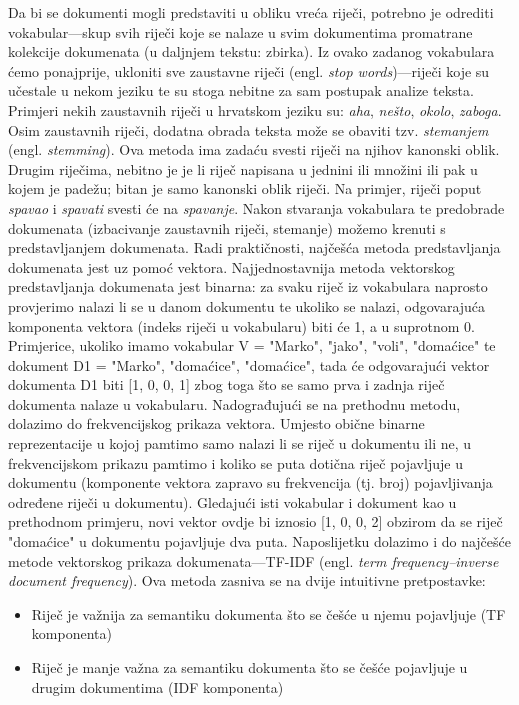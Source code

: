 \documentclass[times, utf8, zavrsni]{fer}
\begin{document}
Da bi se dokumenti mogli predstaviti u obliku vreća riječi, potrebno je odrediti vokabular—skup svih riječi koje se nalaze u svim dokumentima promatrane kolekcije dokumenata (u daljnjem tekstu: zbirka). Iz ovako zadanog vokabulara ćemo ponajprije, ukloniti sve zaustavne riječi (engl. \textit{stop words})—riječi koje su učestale u nekom jeziku te su stoga nebitne za sam postupak analize teksta. Primjeri nekih zaustavnih riječi u hrvatskom jeziku su: \textit{aha}, \textit{nešto}, \textit{okolo}, \textit{zaboga}. Osim zaustavnih riječi, dodatna obrada teksta može se obaviti tzv. \textit{stemanjem} (engl. \textit{stemming}). Ova metoda ima zadaću svesti riječi na njihov kanonski oblik. Drugim riječima, nebitno je je li riječ napisana u jednini ili množini ili pak u kojem je padežu; bitan je samo kanonski oblik riječi. Na primjer, riječi poput \textit{spavao} i \textit{spavati} svesti će na \textit{spavanje}.
Nakon stvaranja vokabulara te predobrade dokumenata (izbacivanje zaustavnih riječi, stemanje) možemo krenuti s predstavljanjem dokumenata. Radi praktičnosti, najčešća metoda predstavljanja dokumenata jest uz pomoć vektora.
Najjednostavnija metoda vektorskog predstavljanja dokumenata jest binarna: za svaku riječ iz vokabulara naprosto provjerimo nalazi li se u danom dokumentu te ukoliko se nalazi, odgovarajuća komponenta vektora (indeks riječi u vokabularu) biti će 1, a u suprotnom 0. Primjerice, ukoliko imamo vokabular V = {"Marko", "jako", "voli", "domaćice"} te dokument D1 = {"Marko", "domaćice", "domaćice"}, tada će odgovarajući vektor dokumenta D1 biti [1, 0, 0, 1] zbog toga što se samo prva i zadnja riječ dokumenta nalaze u vokabularu.
Nadograđujući se na prethodnu metodu, dolazimo do frekvencijskog prikaza vektora. Umjesto obične binarne reprezentacije u kojoj pamtimo samo nalazi li se riječ u dokumentu ili ne, u frekvencijskom prikazu pamtimo i koliko se puta dotična riječ pojavljuje u dokumentu (komponente vektora zapravo su frekvencija (tj. broj) pojavljivanja određene riječi u dokumentu). Gledajući isti vokabular i dokument kao u prethodnom primjeru, novi vektor ovdje bi iznosio [1, 0, 0, 2] obzirom da se riječ "domaćice" u dokumentu pojavljuje dva puta. Naposlijetku dolazimo i do najčešće metode vektorskog prikaza dokumenata—TF-IDF (engl. \textit{term frequency–inverse document frequency}). Ova metoda zasniva se na dvije intuitivne pretpostavke:
\begin{itemize}
\item Riječ je važnija za semantiku dokumenta što se češće u njemu pojavljuje (TF komponenta)
\item Riječ je manje važna za semantiku dokumenta što se češće pojavljuje u drugim dokumentima (IDF komponenta)
\end{itemize}
\end{document}
